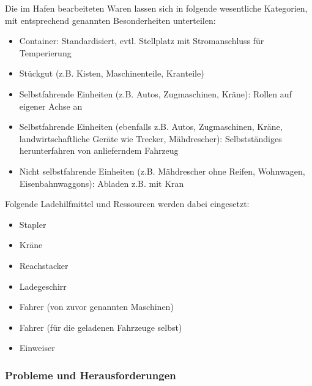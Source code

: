 
Die im Hafen bearbeiteten Waren lassen sich in folgende wesentliche Kategorien, mit entsprechend genannten Besonderheiten unterteilen:
\begin{itemize}
    \item Container: Standardisiert, evtl. Stellplatz mit Stromanschluss für Temperierung 
    \item Stückgut (z.B. Kisten, Maschinenteile, Kranteile) 
    \item Selbstfahrende Einheiten (z.B. Autos, Zugmaschinen, Kräne): Rollen auf eigener Achse an
    \item Selbstfahrende Einheiten (ebenfalls z.B. Autos, Zugmaschinen, Kräne, landwirtschaftliche Geräte wie Trecker, Mähdrescher): Selbstständiges herunterfahren von anlieferndem Fahrzeug 
    \item Nicht selbstfahrende Einheiten (z.B. Mähdrescher ohne Reifen, Wohnwagen, Eisenbahnwaggons): Abladen z.B. mit Kran 
\end{itemize}

Folgende Ladehilfmittel und Ressourcen werden dabei eingesetzt:
\begin{itemize}
    \item Stapler
    \item Kräne
    \item Reachstacker
    \item Ladegeschirr
    \item Fahrer (von zuvor genannten Maschinen)
    \item Fahrer (für die geladenen Fahrzeuge selbst)
    \item Einweiser
\end{itemize}


\subsubsection{Probleme und Herausforderungen}

